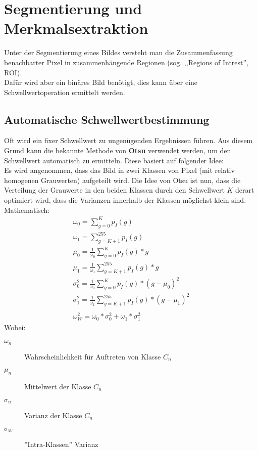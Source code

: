 \section{Segmentierung und Merkmalsextraktion}
Unter der Segmentierung eines Bildes versteht man die Zusammenfassung benachbarter Pixel in zusammenhängende Regionen (sog. ,,Regions of Intrest'', ROI).\\
Dafür wird aber ein binäres Bild benötigt, dies kann über eine Schwellwertoperation ermittelt werden.

\subsection{Automatische Schwellwertbestimmung}
Oft wird ein fixer Schwellwert zu ungenügenden Ergebnissen führen. Aus diesem Grund kann die bekannte Methode von \textbf{Otsu} verwendet werden, um den Schwellwert automatisch zu ermitteln. Diese basiert auf folgender Idee:\\
Es wird angenommen, dass das Bild in zwei Klassen von Pixel (mit relativ homogenen Grauwerten) aufgeteilt wird. Die Idee von Otsu ist nun, dass die Verteilung der Grauwerte in den beiden Klassen durch den Schwellwert $K$ derart optimiert wird, dass die Varianzen innerhalb der Klassen möglichst klein sind.\\
Mathematisch:
\begin{align*}
\omega_0 = \sum_{g=0}^{K}p_I(g)\\
\omega_1 = \sum_{g=K+1}^{255}p_I(g)\\
\mu_0 = \frac{1}{\omega_0}\sum_{g=0}^{K}p_I(g)*g\\
\mu_1 = \frac{1}{\omega_1}\sum_{g=K+1}^{255}p_I(g)*g\\
\sigma^2_0 = \frac{1}{\omega_0}\sum_{g=0}^{K}p_I(g)*(g-\mu_0)^2\\
\sigma^2_1 = \frac{1}{\omega_1}\sum_{g=K+1}^{255}p_I(g)*(g-\mu_1)^2\\
\\
\omega_W^2 = \omega_0 * \sigma_0^2 + \omega_1 * \sigma_1^2
\end{align*}
Wobei:
\begin{description}
    \item[$\omega_n$] Wahrscheinlichkeit für Auftreten von Klasse $C_n$
    \item[$\mu_n$] Mittelwert der Klasse $C_n$
    \item[$\sigma_n$] Varianz der Klasse $C_n$
    \item[$\sigma_W$] ''Intra-Klassen'' Varianz
\end{description}
